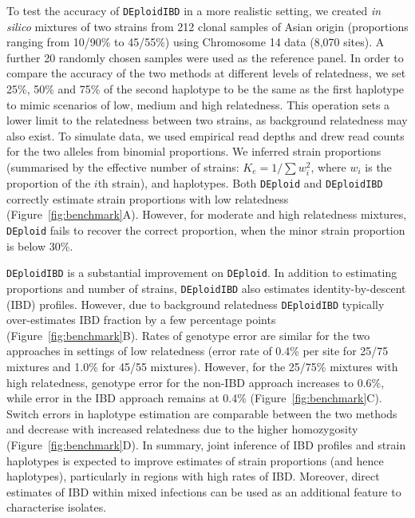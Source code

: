 \documentclass[9pt,lineno]{elife}
\begin{document}
To test the accuracy of \texttt{DEploidIBD} in a more realistic setting, we created {\it in silico} mixtures of two strains from 212 clonal samples of Asian origin (proportions ranging from 10/90\% to 45/55\%) using Chromosome 14 data (8,070 sites).  A further 20 randomly chosen samples were used as the reference panel. In order to compare the accuracy of the two methods at different levels of relatedness, we set 25\%, 50\% and 75\% of the second haplotype to be the same as the first haplotype to mimic scenarios of low, medium and high relatedness. This operation sets a lower limit to the relatedness between two strains, as background relatedness may also exist. To simulate data, we used empirical read depths and drew read counts for the two alleles from binomial proportions.  We inferred strain proportions (summarised by the effective number of strains: $K_e = 1/\sum w_{i}^{2}$, where $w_i$ is the proportion of the $i$th strain), and haplotypes. Both \texttt{DEploid} and \texttt{DEploidIBD} correctly estimate strain proportions with low relatedness (Figure~\ref{fig:benchmark}A). However, for moderate and high relatedness mixtures, \texttt{DEploid} fails to recover the correct proportion, when the minor strain proportion is below 30\%.

\texttt{DEploidIBD} is a substantial improvement on \texttt{DEploid}. In addition to estimating proportions and number of strains, \texttt{DEploidIBD} also estimates identity-by-descent (IBD) profiles. However, due to background relatedness {\tt DEploidIBD} typically over-estimates IBD fraction by a few percentage points  (Figure~\ref{fig:benchmark}B). Rates of genotype error are similar for the two approaches in settings of low relatedness (error rate of 0.4\% per site for 25/75 mixtures and 1.0\% for 45/55 mixtures).  However, for the 25/75\% mixtures with high relatedness, genotype error for the non-IBD approach increases to 0.6\%, while error in the IBD approach remains at 0.4\% (Figure~\ref{fig:benchmark}C). Switch errors in haplotype estimation are comparable between the two methods and decrease with increased relatedness due to the higher homozygosity (Figure~\ref{fig:benchmark}D). In summary, joint inference of IBD profiles and strain haplotypes is expected to improve estimates of strain proportions (and hence haplotypes), particularly in regions with high rates of IBD. Moreover, direct estimates of IBD within mixed infections can be used as an additional feature to characterise isolates.
\end{document}
